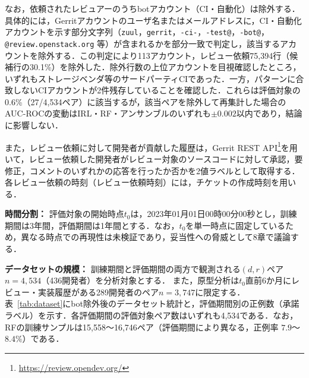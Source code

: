 \documentclass[submit,noauthor,ses,dvipdfmx]{ipsj}
\newcommand{\todo}[1]{\colorbox{yellow}{{\bf TODO}:}{\color{red} {\textbf{[#1]}}}}
\newcommand{\fixstart}{\color{magenta}}
\newcommand{\fixend}{\color{black}}
\begin{document}
なお，依頼されたレビュアーのうちbotアカウント（CI・自動化）は除外する．具体的には，Gerritアカウントのユーザ名またはメールアドレスに，CI・自動化アカウントを示す部分文字列（\texttt{zuul}，\texttt{gerrit}，\texttt{-ci-}，\texttt{-test@}，\texttt{-bot@}，\texttt{@review.openstack.org} 等）が含まれるかを部分一致で判定し，該当するアカウントを除外する．\fixstart この判定により113アカウント，レビュー依頼75,394行（候補行の30.1\%）を除外した．除外行数の上位アカウントを目視確認したところ，いずれもストレージベンダ等のサードパーティCIであった．一方，パターンに合致しないCIアカウントが2件残存していることを確認した．これらは評価対象の0.6\%（27/4,534ペア）に該当するが，該当ペアを除外して再集計した場合のAUC-ROCの変動はIRL・RF・アンサンブルのいずれも$\pm 0.002$以内であり，結論に影響しない．\fixend

また，レビュー依頼に対して開発者が貢献した履歴は，Gerrit REST API\footnote{\url{https://review.opendev.org/}}を用いて，レビュー依頼した開発者がレビュー対象のソースコードに対して承認，要修正，コメントのいずれかの応答を行ったか否かを2値ラベルとして取得する．各レビュー依頼の時刻（レビュー依頼時刻）には，チケットの作成時刻を用いる．

\noindent\textbf{時間分割：}
評価対象の開始時点$t_0$は，2023年01月01日00時00分00秒とし，訓練期間は3年間，評価期間は1年間とする．なお，$t_0$を単一時点に固定しているため，異なる時点での再現性は未検証であり，妥当性への脅威として8章で議論する．

\noindent\textbf{データセットの規模：}
訓練期間と評価期間の両方で観測される$(d, r)$ペア$n = 4,534$（436開発者）を分析対象とする．
また，原型分析は$t_0$直前6か月にレビュー・実装履歴がある289開発者のペア$n = 3,747$に限定する．
\fixstart 表~\ref{tab:dataset}にbot除外後のデータセット統計と，評価期間別の正例数（承諾ラベル）を示す．各評価期間の評価対象ペア数はいずれも4,534である．なお，RFの訓練サンプルは15,558〜16,746ペア（評価期間により異なる，正例率 $7.9$〜$8.4\%$）である．
\end{document}

